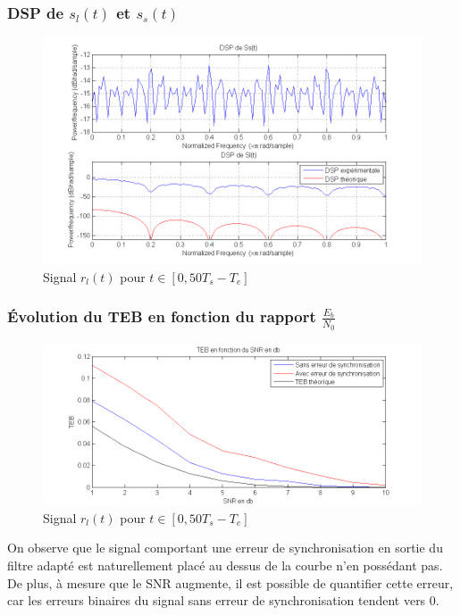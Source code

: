 \documentclass[11pt]{article}
\begin{document}
		\subsubsection{DSP de $s_l(t)$ et $s_s(t)$}
			\begin{figure}[h]
				\centering
				\includegraphics[scale=0.5]{images/Q314.png}
				\caption{Signal $r_l(t)$ pour $t \in [0, 50T_s-T_e]$}
				\label{Q314}
			\end{figure}
			
\newpage
		
		\subsubsection{Évolution du TEB en fonction du rapport $\frac{E_b}{N_0}$}
			\begin{figure}[!ht]
				\centering
				\includegraphics[scale=0.5]{images/Q315-6.png}
				\caption{Signal $r_l(t)$ pour $t \in [0, 50T_s-T_e]$}
				\label{Q315-6}
			\end{figure}
			On observe que le signal comportant une erreur de synchronisation en sortie du filtre adapté est naturellement placé au dessus de la courbe n'en possédant pas.\\
			De plus, à mesure que le SNR augmente, il est possible de quantifier cette erreur, car les erreurs binaires du signal sans erreur de synchronisation tendent vers 0.
			
\end{document}
